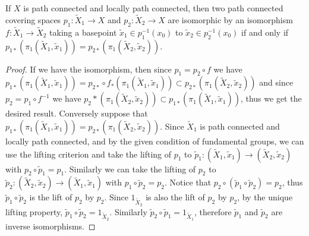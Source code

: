 \begin{prop} If $X$ is path connected and locally path connected, then two path connected covering spaces $p_1:\tilde{X}_1\rightarrow X$ and $p_2:\tilde{X}_2\rightarrow X$ are isomorphic by an isomorphism $f:\tilde{X}_1\rightarrow \tilde{X}_2$ taking a basepoint $\tilde{x}_1\in p_1^{-1}(x_0)$ to $\tilde{x}_2\in p_2^{-1}(x_0)$ if and only if $p_{1*}(\pi_1(\tilde{X}_1,\tilde{x}_1))=p_{2*}(\pi_1(\tilde{X}_2,\tilde{x}_2))$.
\end{prop}
\begin{proof} If we have the isomorphism, then since $p_1=p_2\circ f$ we have $p_{1*}(\pi_1(\tilde{X}_1,\tilde{x}_1))=p_{2*}\circ f_*(\pi_1(\tilde{X}_1,\tilde{x}_1))\subset p_{2*}(\pi_1(\tilde{X}_2,\tilde{x}_2))$ and since $p_2=p_1\circ f^{-1}$ we have $p_2{*}(\pi_1(\tilde{X}_2,\tilde{x}_2))\subset p_{1*}(\pi_1(\tilde{X}_1,\tilde{x}_1))$, thus we get the desired result. Conversely suppose that $p_{1*}(\pi_1(\tilde{X}_1,\tilde{x}_1))=p_{2*}(\pi_1(\tilde{X}_2,\tilde{x}_2))$. Since $\tilde{X}_1$ is path connected and locally path connected, and by the given condition of fundamental groups, we can use the lifting criterion and take the lifting of $p_1$ to $\tilde{p}_1:(\tilde{X}_1,\tilde{x}_1)\rightarrow (\tilde{X}_2,\tilde{x}_2)$ with $p_2\circ \tilde{p}_1=p_1$. Similarly we can take the lifting of $p_2$ to $\tilde{p}_2:(\tilde{X}_2,\tilde{x}_2)\rightarrow (\tilde{X}_1,\tilde{x}_1)$ with $p_1\circ \tilde{p}_2=p_2$. Notice that $p_2\circ (\tilde{p}_1\circ \tilde{p}_2)=p_2$, thus $\tilde{p}_1\circ \tilde{p}_2$ is the lift of $p_2$ by $p_2$. Since $1_{\tilde{X}_2}$ is also the lift of $p_2$ by $p_2$, by the unique lifting property, $\tilde{p}_1\circ \tilde{p}_2=1_{\tilde{X}_2}$. Similarly $\tilde{p}_2\circ \tilde{p}_1=1_{\tilde{X}_1}$, therefore $\tilde{p}_1$ and $\tilde{p}_2$ are inverse isomorphisms.
\end{proof}

